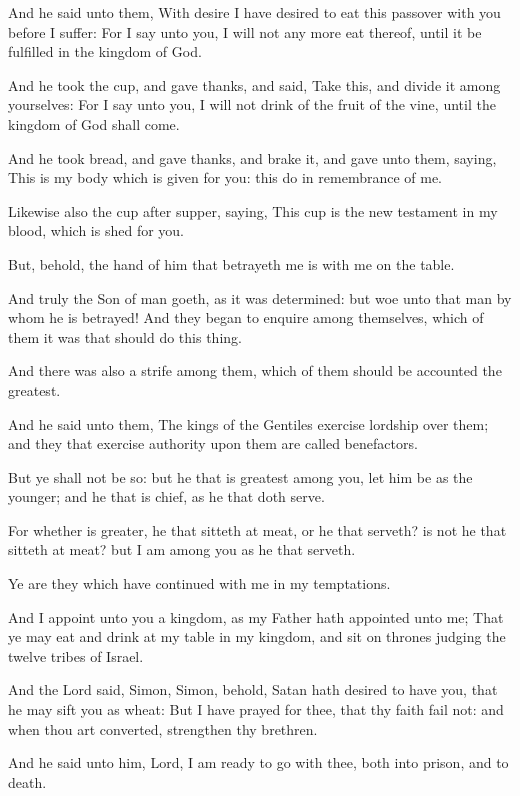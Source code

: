 \verse And he said unto them, With desire I have desired to eat this passover with you before I suffer: \verse For I say unto you, I will not any more eat thereof, until it be fulfilled in the kingdom of God.

\verse And he took the cup, and gave thanks, and said, Take this, and divide it among yourselves: \verse For I say unto you, I will not drink of the fruit of the vine, until the kingdom of God shall come.

\verse And he took bread, and gave thanks, and brake it, and gave unto them, saying, This is my body which is given for you: this do in remembrance of me.

\verse Likewise also the cup after supper, saying, This cup is the new testament in my blood, which is shed for you.

\verse But, behold, the hand of him that betrayeth me is with me on the table.

\verse And truly the Son of man goeth, as it was determined: but woe unto that man by whom he is betrayed!  \verse And they began to enquire among themselves, which of them it was that should do this thing.

\verse And there was also a strife among them, which of them should be accounted the greatest.

\verse And he said unto them, The kings of the Gentiles exercise lordship over them; and they that exercise authority upon them are called benefactors.

\verse But ye shall not be so: but he that is greatest among you, let him be as the younger; and he that is chief, as he that doth serve.

\verse For whether is greater, he that sitteth at meat, or he that serveth?  is not he that sitteth at meat? but I am among you as he that serveth.

\verse Ye are they which have continued with me in my temptations.

\verse And I appoint unto you a kingdom, as my Father hath appointed unto me; \verse That ye may eat and drink at my table in my kingdom, and sit on thrones judging the twelve tribes of Israel.

\verse And the Lord said, Simon, Simon, behold, Satan hath desired to have you, that he may sift you as wheat: \verse But I have prayed for thee, that thy faith fail not: and when thou art converted, strengthen thy brethren.

\verse And he said unto him, Lord, I am ready to go with thee, both into prison, and to death.

